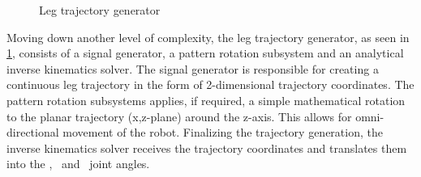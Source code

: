 \begin{figure}
	\centerline{}
	\caption{Leg trajectory generator}
	\label{figure: Leg trajectory generator}
\end{figure}

Moving down another level of complexity, the leg trajectory generator, as seen in \ref{figure: Leg trajectory generator}, consists of a signal generator, a pattern rotation subsystem and an analytical inverse kinematics solver.
The signal generator is responsible for creating a continuous leg trajectory in the form of 2-dimensional trajectory coordinates.
The pattern rotation subsystems applies, if required, a simple mathematical rotation to  the planar trajectory (x,z-plane) around the z-axis.
This allows for omni-directional movement of the robot.
Finalizing the trajectory generation, the inverse kinematics solver receives the trajectory coordinates and translates them into the \textalpha, \textbeta \ and \textgamma \ joint angles.



